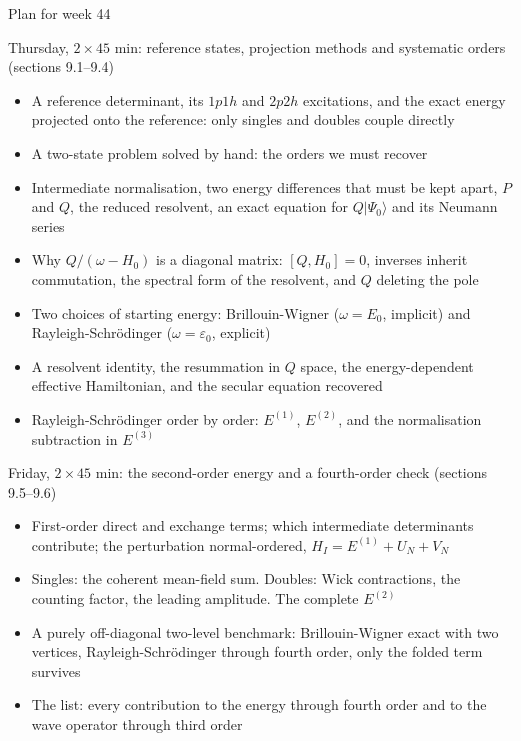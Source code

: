 \documentclass[aspectratio=169,10pt]{beamer}
\newcommand{\ket}[1]{\vert #1\rangle}
\newcommand{\Psizero}{\Psi_0}
\begin{document}
\begin{frame}[shrink=10]{Plan for week 44}
  \begin{block}{Thursday, $2\times45$ min: reference states, projection methods and systematic orders (sections 9.1--9.4)}
    \begin{itemize}
      \item A reference determinant, its $1p1h$ and $2p2h$ excitations, and the exact energy projected onto the reference: only singles and doubles couple directly
      \item A two-state problem solved by hand: the orders we must recover
      \item Intermediate normalisation, two energy differences that must be kept apart, $P$ and $Q$, the reduced resolvent, an exact equation for $Q\ket{\Psizero}$ and its Neumann series
      \item Why $Q/(\omega-H_0)$ is a diagonal matrix: $[Q,H_0]=0$, inverses inherit commutation, the spectral form of the resolvent, and $Q$ deleting the pole
      \item Two choices of starting energy: Brillouin-Wigner ($\omega=E_0$, implicit) and Rayleigh-Schr\"odinger ($\omega=\varepsilon_0$, explicit)
      \item A resolvent identity, the resummation in $Q$ space, the energy-dependent effective Hamiltonian, and the secular equation recovered
      \item Rayleigh-Schr\"odinger order by order: $E^{(1)}$, $E^{(2)}$, and the normalisation subtraction in $E^{(3)}$
    \end{itemize}
  \end{block}
  \begin{block}{Friday, $2\times45$ min: the second-order energy and a fourth-order check (sections 9.5--9.6)}
    \begin{itemize}
      \item First-order direct and exchange terms; which intermediate determinants contribute; the perturbation normal-ordered, $H_I=E^{(1)}+U_N+V_N$
      \item Singles: the coherent mean-field sum. Doubles: Wick contractions, the counting factor, the leading amplitude. The complete $E^{(2)}$
      \item A purely off-diagonal two-level benchmark: Brillouin-Wigner exact with two vertices, Rayleigh-Schr\"odinger through fourth order, only the folded term survives
      \item \alert{The list}: every contribution to the energy through fourth order and to the wave operator through third order
    \end{itemize}
  \end{block}
\end{frame}
\end{document}
